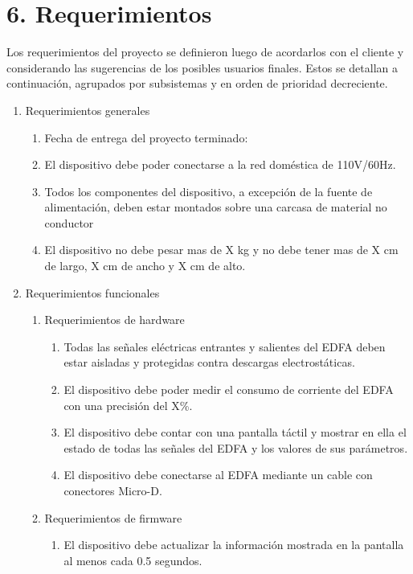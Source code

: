 \documentclass[
11pt, %
codirector, %
]{charter}
\begin{document}
\section{6. Requerimientos}
\label{sec:requerimientos}

Los requerimientos del proyecto se definieron luego de acordarlos con el cliente y considerando las sugerencias de los posibles usuarios finales. Estos se detallan a continuación, agrupados por subsistemas y en orden de prioridad decreciente.

\begin{enumerate}
	\item Requerimientos generales
		\begin{enumerate}
			\item Fecha de entrega del proyecto terminado:
			\item El dispositivo debe poder conectarse a la red doméstica de 110V/60Hz.
			\item Todos los componentes del dispositivo, a excepción de la fuente de alimentación, deben estar montados sobre una carcasa de material no conductor
			\item El dispositivo no debe pesar mas de X kg y no debe tener mas de X cm de largo, X cm de ancho y X cm de alto.
		\end{enumerate}
	\item Requerimientos funcionales
		\begin{enumerate}
			\item Requerimientos de hardware
				\begin{enumerate}
					\item Todas las señales eléctricas entrantes y salientes del EDFA deben estar aisladas y protegidas contra descargas electrostáticas.
					\item El dispositivo debe poder medir el consumo de corriente del EDFA con una precisión del X\%.
					\item El dispositivo debe contar con una pantalla táctil y mostrar en ella el estado de todas las señales del EDFA y los valores de sus parámetros.
					\item El dispositivo debe conectarse al EDFA mediante un cable con conectores Micro-D.
				\end{enumerate}
			\item Requerimientos de firmware
				\begin{enumerate}
					\item El dispositivo debe actualizar la información mostrada en la pantalla al menos cada 0.5 segundos.

\end{enumerate}
\end{enumerate}
\end{enumerate}
\end{document}
